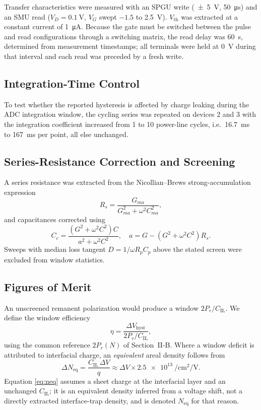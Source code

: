 \documentclass[journal]{IEEEtran}
\newcommand{\rev}[1]{#1}                    %
\newcommand{\Prem}{P_r}
\newcommand{\Vth}{V_{\mathrm{th}}}
\newcommand{\Neq}{N_{\mathrm{eq}}}
\newcommand{\dVh}{\Delta V_{\mathrm{hyst}}}
\newcommand{\Cil}{C_{\mathrm{IL}}}
\newcommand{\Rs}{R_s}
\begin{document}
\rev{Transfer characteristics were measured with an SPGU write
(\SI{\pm5}{\volt}, \SI{50}{\micro\second}) and an SMU read
($V_D=\SI{0.1}{\volt}$, $V_G$ swept $-1.5$ to \SI{+2.5}{\volt}).
$\Vth$ was extracted at a constant current of \SI{1}{\micro\ampere}.
Because the gate must be switched between the pulse and read
configurations through a switching matrix, the read delay was
\SI{60}{\second}, determined from measurement timestamps; all terminals
were held at \SI{0}{\volt} during that interval and each read was
preceded by a fresh write.}

\rev{\subsection{Integration-Time Control}
To test whether the reported hysteresis is affected by charge leaking
during the ADC integration window, the cycling series was repeated on
devices 2 and 3 with the integration coefficient increased from 1 to 10
power-line cycles, i.e.\ \SI{16.7}{\milli\second} to
\SI{167}{\milli\second} per point, all else unchanged.}

\subsection{Series-Resistance Correction and Screening}
A series resistance was extracted from the Nicollian--Brews
strong-accumulation expression \cite{nicollian1982,schroder2006}
\begin{equation}
\Rs = \frac{G_{ma}}{G_{ma}^{2}+\omega^{2}C_{ma}^{2}},
\label{eq:rs}
\end{equation}
and capacitances corrected using
\begin{equation}
C_c=\frac{(G^{2}+\omega^{2}C^{2})C}{a^{2}+\omega^{2}C^{2}},\quad
a=G-(G^{2}+\omega^{2}C^{2})\Rs .
\label{eq:corr}
\end{equation}
Sweeps with median loss tangent $D=1/\omega R_pC_p$ above the stated
screen were excluded from window statistics.

\subsection{Figures of Merit}
An unscreened remanent polarization would produce a window
$2\Prem/\Cil$. We define the window efficiency
\begin{equation}
\eta = \frac{\dVh}{2\Prem/\Cil},
\label{eq:eta}
\end{equation}
\rev{using the common reference $2\Prem(N)$ of Section~II-B. Where a
window deficit is attributed to interfacial charge, an \emph{equivalent}
areal density follows from}
\begin{equation}
\rev{\Delta\Neq=\frac{\Cil\,\Delta V}{q}
 \approx\Delta V\times\SI{2.5e13}{\per\centi\meter\squared\per\volt}.}
\label{eq:neq}
\end{equation}
\rev{Equation \eqref{eq:neq} assumes a sheet charge at the interfacial
layer and an unchanged $\Cil$; it is an equivalent density inferred from
a voltage shift, not a directly extracted interface-trap density, and is
denoted $\Neq$ for that reason.}
\end{document}
